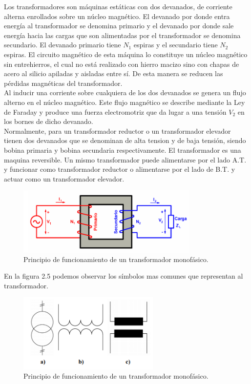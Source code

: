 Los transformadores son máquinas estáticas con dos devanados, de corriente alterna enrollados sobre un núcleo magnético. El devanado por donde entra energía al transformador se denomina primario y el devanado por donde sale energía hacia las cargas que son alimentadas por el transformador se denomina secundario. El devanado primario tiene $N_{1}$ espiras y el secundario tiene $N_{2}$ espiras. El circuito magnético de esta máquina lo constituye un núcleo magnético sin entrehierros, el cual no está realizado con hierro macizo sino con chapas de acero al silicio apiladas y aisladas entre sí. De esta manera se reducen las pérdidas magnéticas del transformador.\\

Al inducir una corriente sobre cualquiera de los dos devanados se genera un flujo alterno en el núcleo magnético. Este flujo magnético se describe mediante la Ley de Faraday y produce una fuerza electromotriz que da lugar a una tensión $V_{2}$ en los bornes de dicho devanado.\\

Normalmente, para un transformador reductor o un transformador elevador tienen dos devanados que se denominan de alta tension y de baja tensión, siendo bobina primaria y bobina secundaria respectivamente. El transformador es una maquina reversible. Un mismo transformador puede alimentarse por el lado A.T. y funcionar como transformador reductor o alimentarse por el lado de B.T. y actuar como un transformador elevador.

\begin{figure}[H]
\centering
\includegraphics[width=9cm]{capitulo3/figs/trans.png}
\caption{ Principio de funcionamiento de un transformador monofásico.}
\end{figure}

En la figura 2.5 podemos observar los símbolos mas comunes que representan al transformador. 

\begin{figure}[H]
\centering
\includegraphics[width=7cm]{capitulo3/figs/simbolos.png}
\caption{ Principio de funcionamiento de un transformador monofásico.}
\end{figure}

